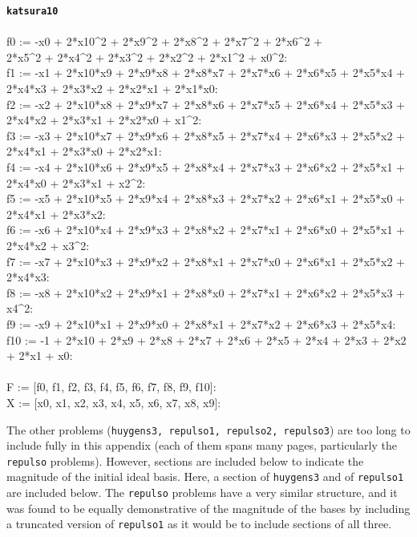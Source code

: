 \documentclass[letterpaper,12pt,titlepage,oneside,final]{book}
\newenvironment{codefont}{\footnotesize\ttfamily}{\par}
\begin{document}
\begin{appendices}
\noindent\textbf{\texttt{katsura10}}\\\\
\noindent\begin{codefont}
 f0 := -x0 + 2*x10\^{}2 + 2*x9\^{}2 + 2*x8\^{}2 + 2*x7\^{}2 + 2*x6\^{}2 + \\2*x5\^{}2 + 2*x4\^{}2 + 2*x3\^{}2 + 2*x2\^{}2 + 2*x1\^{}2 + x0\^{}2:
\\
f1 := -x1 + 2*x10*x9 + 2*x9*x8 + 2*x8*x7 + 2*x7*x6 + 2*x6*x5 + 2*x5*x4 + \\2*x4*x3 + 2*x3*x2 + 2*x2*x1 + 2*x1*x0:
\\
f2 := -x2 + 2*x10*x8 + 2*x9*x7 + 2*x8*x6 + 2*x7*x5 + 2*x6*x4 + 2*x5*x3 + \\2*x4*x2 + 2*x3*x1 + 2*x2*x0 + x1\^{}2:
\\
f3 := -x3 + 2*x10*x7 + 2*x9*x6 + 2*x8*x5 + 2*x7*x4 + 2*x6*x3 + 2*x5*x2 + \\2*x4*x1 + 2*x3*x0 + 2*x2*x1:
\\
f4 := -x4 + 2*x10*x6 + 2*x9*x5 + 2*x8*x4 + 2*x7*x3 + 2*x6*x2 + 2*x5*x1 + \\2*x4*x0 + 2*x3*x1 + x2\^{}2:
\\
f5 := -x5 + 2*x10*x5 + 2*x9*x4 + 2*x8*x3 + 2*x7*x2 + 2*x6*x1 + 2*x5*x0 + \\2*x4*x1 + 2*x3*x2:
\\
f6 := -x6 + 2*x10*x4 + 2*x9*x3 + 2*x8*x2 + 2*x7*x1 + 2*x6*x0 + 2*x5*x1 + \\2*x4*x2 + x3\^{}2:
\\
f7 := -x7 + 2*x10*x3 + 2*x9*x2 + 2*x8*x1 + 2*x7*x0 + 2*x6*x1 + 2*x5*x2 + 2*x4*x3:
\\
f8 := -x8 + 2*x10*x2 + 2*x9*x1 + 2*x8*x0 + 2*x7*x1 + 2*x6*x2 + 2*x5*x3 + x4\^{}2:
\\
f9 := -x9 + 2*x10*x1 + 2*x9*x0 + 2*x8*x1 + 2*x7*x2 + 2*x6*x3 + 2*x5*x4:
\\
f10 := -1 + 2*x10 + 2*x9 + 2*x8 + 2*x7 + 2*x6 + 2*x5 + 2*x4 + 2*x3 + 2*x2 + 2*x1 + x0:
\\
\\
F := [f0, f1, f2, f3, f4, f5, f6, f7, f8, f9, f10]:
\\
X := [x0, x1, x2, x3, x4, x5, x6, x7, x8, x9]:\\
\end{codefont}

\doublespacing


The other problems (\texttt{huygens3, repulso1, repulso2, repulso3}) are too long to include fully in this appendix (each of them spans many pages, particularly the \texttt{repulso} problems).  However, sections are included below to indicate the magnitude of the initial ideal basis.  Here, a section of \texttt{huygens3} and of \texttt{repulso1} are included below.  The \texttt{repulso} problems have a very similar structure, and it was found to be equally demonstrative of the magnitude of the bases by including a truncated version of \texttt{repulso1} as it would be to include sections of all three.


\end{appendices}
\end{document}
